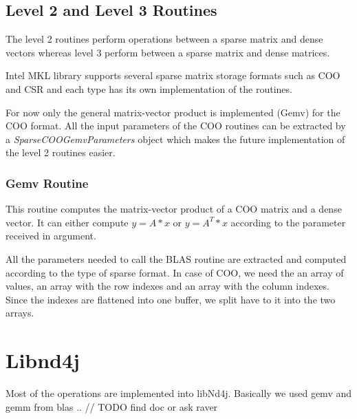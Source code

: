 \subsection{Level 2 and Level 3 Routines}

The level 2 routines perform operations between a sparse matrix and dense vectors whereas level 3 perform between a sparse matrix and dense matrices.

Intel MKL library supports several  sparse matrix storage formats such as COO and CSR and each type has its own implementation of the routines.

For now only the general matrix-vector product is implemented (Gemv) for the COO format. All the input parameters of the COO routines can be extracted by a \textit{SparseCOOGemvParameters} object which makes the future implementation of the level 2 routines easier.

\subsubsection{Gemv Routine}
This routine computes the matrix-vector product of a COO matrix and a dense vector. It can either compute $y = A*x$ or $y = A^{T}*x$ according to the parameter received in argument.

All the parameters needed to call the BLAS routine are extracted and computed according to the type of sparse format.
In case of COO, we need the an array of values, an array with the row indexes and an array with the column indexes. Since the indexes are flattened into one buffer, we split have to it into the two arrays.

\section{Libnd4j}
Most of the operations are implemented into libNd4j. Basically we used gemv and gemm from blas
..
// TODO find doc or ask raver